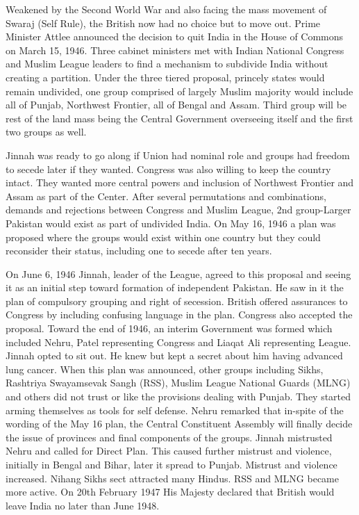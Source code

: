 Weakened by the Second World War and also facing the mass movement of Swaraj (Self Rule), the British now had no choice but to move out. Prime Minister Attlee announced the decision to quit India in the House of Commons on March 15, 1946. Three cabinet ministers met with Indian National Congress and Muslim League leaders to find a mechanism to subdivide India without creating a partition. Under the three tiered proposal, princely states would remain undivided, one group comprised of largely Muslim majority would include all of Punjab, Northwest Frontier, all of Bengal and Assam. Third group will be rest of the land mass being the Central Government overseeing itself and the first two groups as well. 

Jinnah was ready to go along if Union had nominal role and groups had freedom to secede later if they wanted. Congress was also willing to keep the country intact. They wanted more central powers and inclusion of Northwest Frontier and Assam as part of the Center. After several permutations and combinations, demands and rejections between Congress and Muslim League, 2nd group-Larger Pakistan would exist as part of undivided India. On May 16, 1946 a plan was proposed where the groups would exist within one country but they could reconsider their status, including one to secede after ten years. 

On June 6, 1946 Jinnah, leader of the League, agreed to this proposal and seeing it as an initial step toward formation of independent Pakistan. He saw in it the plan of compulsory grouping and right of secession. British offered assurances to Congress by including confusing language in the plan. Congress also accepted the proposal. Toward the end of 1946, an interim Government was formed which included Nehru, Patel representing Congress and Liaqat Ali representing League. Jinnah opted to sit out. He knew but kept a secret about him having advanced lung cancer. 
When this plan was announced, other groups including Sikhs, Rashtriya Swayamsevak Sangh (RSS), Muslim League National Guards (MLNG) and others did not trust or like the provisions dealing with Punjab. They started arming themselves as tools for self defense. 
Nehru remarked that in-spite of the wording of the May 16 plan, the Central Constituent Assembly will finally decide the issue of provinces and final components of the groups. Jinnah mistrusted Nehru and called for Direct Plan. This caused further mistrust and violence, initially in Bengal and Bihar, later it spread to Punjab. Mistrust and violence increased. Nihang Sikhs sect attracted many Hindus. RSS and MLNG became more active. On 20th February 1947 His Majesty declared that British would leave India no later than June 1948. 

